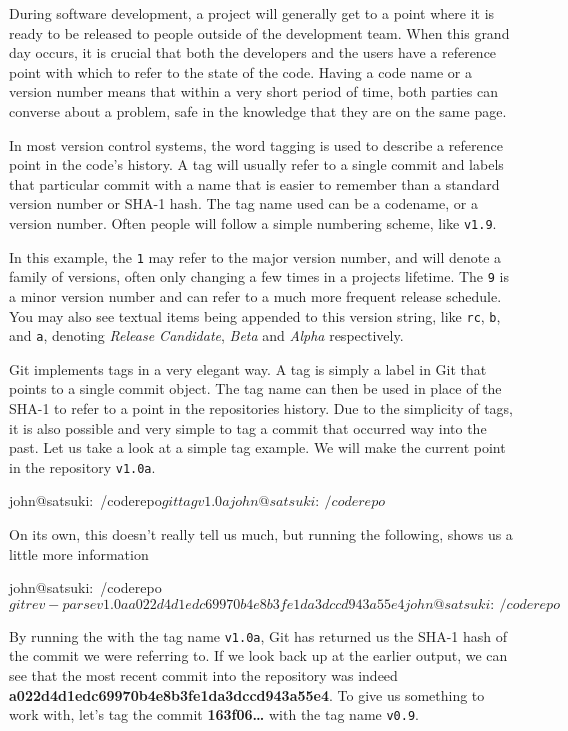 During software development, a project will generally get to a point where it is ready to be released to people outside of the development team.  When this grand day occurs, it is crucial that both the developers and the users have a reference point with which to refer to the state of the code.  Having a code name or a version number means that within a very short period of time, both parties can converse about a problem, safe in the knowledge that they are on the same page.

In most version control systems, the word tagging is used to describe a reference point in the code's history.  A tag will usually refer to a single commit and labels that particular commit with a name that is easier to remember than a standard version number or SHA-1 hash.  The tag name used can be a codename, or a version number.  Often people will follow a simple numbering scheme, like \texttt{v1.9}.  

In this example, the \texttt{1} may refer to the major version number, and will denote a family of versions, often only changing a few times in a projects lifetime.  The \texttt{9} is a minor version number and can refer to a much more frequent release schedule.  You may also see textual items being appended to this version string, like \texttt{rc}, \texttt{b}, and \texttt{a}, denoting \emph{Release Candidate}, \emph{Beta} and \emph{Alpha} respectively.

Git implements tags in a very elegant way.  A tag is simply a label in Git that points to a single commit object.  The tag name can then be used in place of the SHA-1 to refer to a point in the repositories history.  Due to the simplicity of tags, it is also possible and very simple to tag a commit that occurred way into the past.  Let us take a look at a simple tag example.  We will make the current point in the repository \texttt{v1.0a}.

\begin{code}
john@satsuki:~/coderepo$ git tag v1.0a
john@satsuki:~/coderepo$ 
\end{code}

On its own, this doesn't really tell us much, but running the following, shows us a little more information

\begin{code}
john@satsuki:~/coderepo$ git rev-parse v1.0a
a022d4d1edc69970b4e8b3fe1da3dccd943a55e4
john@satsuki:~/coderepo$ 
\end{code}

By running the  with the tag name \texttt{v1.0a}, Git has returned us the SHA-1 hash of the commit we were referring to.  If we look back up at the earlier output, we can see that the most recent commit into the repository was indeed \textbf{a022d4d1edc69970b4e8b3fe1da3dccd943a55e4}.  To give us something to work with, let's tag the commit \textbf{163f06\ldots} with the tag name \texttt{v0.9}.

